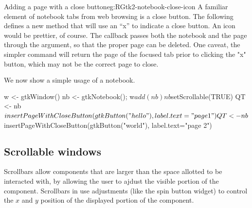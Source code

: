\begin{example}{Adding a page with a close button}{eg:RGtk2-notebook-close-icon}
A familiar element of notebook tabs from web browsing is a close button. The following
defines a new method 
that will use an ``x'' to indicate a close button. An icon would be
prettier, of course. The callback passes both the notebook and the
page through the  argument, so that the proper page can be
deleted. One caveat, the simpler command 
will return the page of the focused tab prior to clicking the "x"
button, which may not be the correct page to close.

\begin{Schunk}
\end{Schunk}

We now show a simple usage of a notebook.
\begin{Schunk}
\begin{Sinput}
 w <- gtkWindow()
 nb <- gtkNotebook(); w$add(nb)
 nb$setScrollable(TRUE)
 QT <- nb$insertPageWithCloseButton(gtkButton("hello"), 
                                    label.text="page 1")
 QT <- nb$insertPageWithCloseButton(gtkButton("world"), 
                                    label.text="page 2")
\end{Sinput}
\end{Schunk}
  
\end{example}


\subsection{Scrollable windows}
\label{sec:RGtk2:scroll-windows}

Scrollbars allow components that are larger than the space allotted to
be interacted with, by allowing the user to ajdust the visible portion
of the component. Scrollbars in \GTK\/ use adjustments (like the
spin button widget) to control the $x$ and $y$ position of the
displayed portion of the component.

